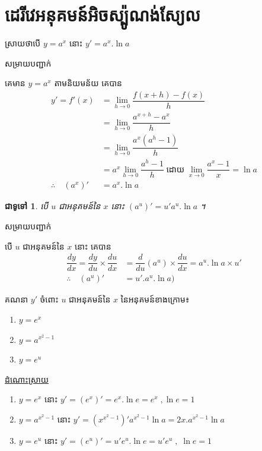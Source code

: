 \documentclass[12pt,fleqn]{book} %
\newtheorem{general}{\kml ជាទូទៅ}
\newcommand{\answer}{\begin{center}
\kml \color{blue} \underline{ដំណោះស្រាយ}
\end{center}}
\newcommand{\solution}{{\begin{center}\kml \color{blue} សម្រាយបញ្ជាក់\end{center} }}
\begin{document}
\section{ដេរីវេអនុគមន៍អិចស្ប៉ូណង់ស្យែល}
ស្រាយថាបើ $y=a^x$ នោះ $y'=a^x .\ln a$
\solution
គេមាន $y=a^x$ តាមនិយមន័យ គេបាន
\begin{align*}
y'=f'(x)&=\lim_{h\to 0}\dfrac{f(x+h)-f(x)}{h}\\
&=\lim_{h\to 0}\dfrac{a^{x+h}-a^{x}}{h}\\
&=\lim_{h\to 0}\dfrac{a^{x}(a^h-1)}{h}\\
&=a^{x}\lim_{h\to 0}\dfrac{a^h-1}{h}\;\text{ដោយ}\; \lim_{x\to 0}\dfrac{a^x-1}{x}=\ln a\\
\therefore \quad (a^x)'&=a^x. \ln a
\end{align*}
\begin{general}
បើ $u$ ជាអនុគមន៍នៃ $x$ នោះ $(a^u)'=u'a^u.\ln a$ ។ 
\end{general}
\solution 
បើ $u$ ជាអនុគមន៍នៃ $x$ នោះ  គេបាន 
\begin{align*}
\dfrac{dy}{dx}=\dfrac{dy}{du}\times \dfrac{du}{dx}&=\dfrac{d}{du}(a^u)\times \dfrac{du}{dx}=a^u.\ln a \times u'\\
\therefore \quad (a^u)'&=u'.a^u .\ln a)
\end{align*}
\begin{example}
គណនា $y'$ ចំពោះ $u$ ជាអនុគមន៍នៃ $x$ នៃអនុគមន៍ខាងក្រោម៖
\begin{multicols}{3}
\begin{enumerate}
\item $y=e^x$  
\item $y=a^{x^2-1}$
\item $y=e^u$ 
\end{enumerate}
\end{multicols}
\end{example}
\answer
\begin{enumerate}
 \item  $y=e^x$ នោះ $y'=(e^x)'=e^x.\ln e=e^x\;,\ln e=1$ 
 \item $y=a^{x^2-1}$ នោះ $y'=(x^{x^2-1})'a^{x^2-1}\ln a=2x.a^{x^2-1}\ln a$
\item $y=e^u$ នោះ $y'=(e^u)'=u'e^u.\ln e=u'e^u\;,\;\ln e=1$
\end{enumerate}
\end{document}
